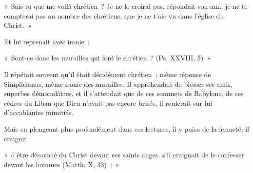 \documentclass[french,twoside]{book} %
\newenvironment{quoteblock}%
  {\begin{quoting}}
  {\end{quoting}}
\newenvironment{quotebar}{%
    \def\FrameCommand{{\color{rubric!10!}\vrule width 0.5em} \hspace{0.9em}}%
    \def\OuterFrameSep{\itemsep} %
    \MakeFramed {\advance\hsize-\width \FrameRestore}
  }%
  {%
    \endMakeFramed
  }
\renewenvironment{quoteblock}%
  {%
    \savenotes
    \setstretch{0.9}
    \normalfont
    \begin{quotebar}
  }
  {%
    \end{quotebar}
    \spewnotes
  }
\begin{document}
\begin{quoteblock}
\noindent « Sais-tu que me voilà chrétien ? Je ne le croirai pas, répondait son ami, je ne te compterai pas au nombre des chrétiens, que je ne t’aie vu dans l’église du Christ. »\end{quoteblock}

\noindent Et lui reprenait avec ironie :\par

\begin{quoteblock}
\noindent « Sont-ce donc les murailles qui font le chrétien ? (Ps. XXVIII, 5) »\end{quoteblock}

\noindent Il répétait souvent qu’il était décidément chrétien ; même réponse de Simplicianus, même ironie des murailles. Il appréhendait de blesser ses amis, superbes démonolâtres, et il s’attendait que de ces sommets de Babylone, de ces cèdres du Liban que Dieu n’avait pas encore brisés, il roulerait sur lui d’accablantes inimitiés.\par
Mais en plongeant plus profondément dans ces lectures, il y puisa de la fermeté, il craignit\par

\begin{quoteblock}
\noindent « d’être désavoué du Christ devant ses saints anges, s’il craignait de le confesser devant les hommes (Matth. X, 33) ; »\end{quoteblock}
\end{document}
